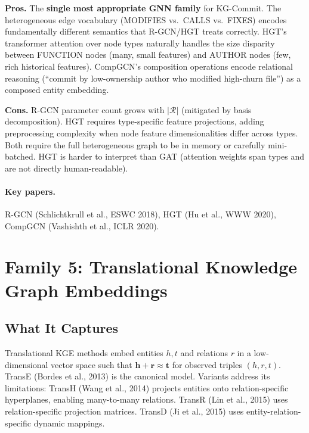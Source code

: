 \documentclass[12pt,a4paper]{article}
\begin{document}
\begin{prosbox}
\textbf{Pros.}
The \textbf{single most appropriate GNN family} for KG-Commit. The
heterogeneous edge vocabulary (MODIFIES vs.\ CALLS vs.\ FIXES) encodes
fundamentally different semantics that R-GCN/HGT treats correctly.
HGT's transformer attention over node types naturally handles the size
disparity between FUNCTION nodes (many, small features) and AUTHOR nodes
(few, rich historical features). CompGCN's composition operations encode
relational reasoning (``commit by low-ownership author who modified
high-churn file'') as a composed entity embedding.
\end{prosbox}

\begin{consbox}
\textbf{Cons.}
R-GCN parameter count grows with $|\mathcal{R}|$ (mitigated by basis
decomposition). HGT requires type-specific feature projections, adding
preprocessing complexity when node feature dimensionalities differ across
types. Both require the full heterogeneous graph to be in memory or carefully
mini-batched. HGT is harder to interpret than GAT (attention weights span
types and are not directly human-readable).
\end{consbox}

\paragraph{Key papers.} R-GCN (Schlichtkrull et al., ESWC 2018), HGT
(Hu et al., WWW 2020), CompGCN (Vashishth et al., ICLR 2020).

\section{Family 5: Translational Knowledge Graph Embeddings}

\subsection{What It Captures}

Translational KGE methods embed entities $h, t$ and relations $r$ in a
low-dimensional vector space such that $\mathbf{h} + \mathbf{r} \approx \mathbf{t}$
for observed triples $(h, r, t)$. TransE (Bordes et al., 2013) is the canonical
model. Variants address its limitations: TransH (Wang et al., 2014) projects
entities onto relation-specific hyperplanes, enabling many-to-many relations.
TransR (Lin et al., 2015) uses relation-specific projection matrices.
TransD (Ji et al., 2015) uses entity-relation-specific dynamic mappings.
\end{document}
